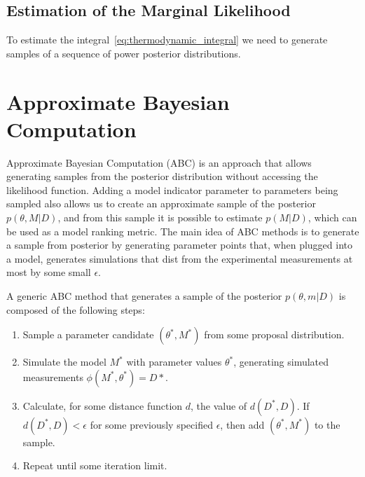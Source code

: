 \subsection{Estimation of the Marginal Likelihood}
To estimate the integral~\ref{eq:thermodynamic_integral} we need to 
generate samples of a sequence of power posterior distributions.


\section{Approximate Bayesian Computation}
Approximate Bayesian Computation (ABC) is an approach that allows 
generating samples from the posterior distribution without accessing the
likelihood function. Adding a model indicator parameter to parameters 
being sampled also allows us to create an approximate sample of the 
posterior $p (\theta, M | D)$, and from this sample it is possible to 
estimate $p (M | D)$, which can be used as a model ranking metric. The 
main idea of ABC methods is to generate a sample from posterior by 
generating parameter points that, when plugged into a model, generates 
simulations that dist from the experimental measurements at most by some
small $\epsilon$.

A generic ABC method that generates a sample of the posterior 
$p (\theta, m | D)$ is composed of the following steps:
\begin{enumerate}
    \item{Sample a parameter candidate $(\theta^*, M^*)$ from some 
        proposal distribution.} \label{alg:abc_step1}
    \item{Simulate the model $M^*$ with parameter values $\theta^*$, 
        generating simulated measurements $\phi (M^*, \theta^*) = D*$.}
    \item{Calculate, for some distance function $d$, the value of
        $d (D^*, D)$. If $d (D^*, D) < \epsilon$ for some previously
        specified $\epsilon$, then add $(\theta^*, M^*)$ to the sample.}
    \item{Repeat until some iteration limit.}
\end{enumerate}


